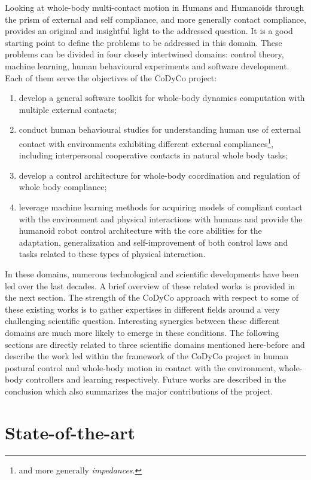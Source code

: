 \documentclass[final,5p,twocolumn]{elsarticle}
\begin{document}
Looking at whole-body multi-contact motion in Humans and Humanoids through the prism of external and self compliance, and more generally contact compliance, provides an original and insightful light to the addressed question. It is a good starting point to define the problems to be addressed in this domain. These problems can be divided in four closely intertwined domains: control theory, machine learning, human behavioural experiments and software development. Each of them serve the objectives of the CoDyCo project:
\begin{enumerate}
\item develop a general software toolkit for whole-body dynamics computation with multiple external contacts;
\item conduct human behavioural studies for understanding human use of external contact with environments exhibiting different external compliances\footnote{and more generally \textit{impedances}.}, including interpersonal cooperative contacts in natural whole body tasks;
\item develop a control architecture for whole-body coordination and regulation of whole body compliance;
\item leverage machine learning methods for acquiring models of compliant contact with the environment and physical interactions with humans and provide the humanoid robot control architecture with the core abilities for the adaptation, generalization and self-improvement of both control laws and tasks related to these types of physical interaction.
\end{enumerate}

In these domains, numerous technological and scientific developments have been led over the last decades. A brief overview of these related works is provided in the next section. The strength of the CoDyCo approach with respect to some of these existing works is to gather expertises in different fields around a very challenging scientific question. Interesting synergies between these different domains are much more likely to  emerge in these conditions. The following sections are directly related to three scientific domains mentioned here-before and describe the work led within the framework of the CoDyCo project in human postural control and whole-body motion in contact with the environment, whole-body controllers and learning respectively. Future works are described in the conclusion which also summarizes the major contributions of the project.

\section{State-of-the-art}
\end{document}
